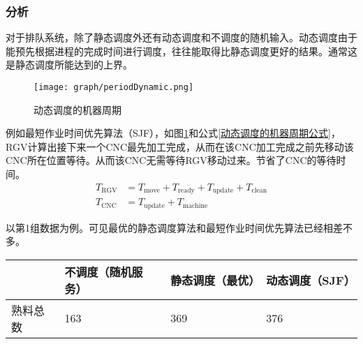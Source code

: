 		\subsubsection{分析}
			对于排队系统，除了静态调度外还有动态调度和不调度的随机输入。动态调度由于能预先根据进程的完成时间进行调度，往往能取得比静态调度更好的结果。通常这是静态调度所能达到的上界。
			\begin{figure}[htbp]
				\centering
				\caption{动态调度的机器周期}
				\label{动态调度的机器周期}
				\texttt{[image: graph/periodDynamic.png]}
			\end{figure}
			\par\indent 例如最短作业时间优先算法（SJF），如图\ref{动态调度的机器周期}和公式\ref{动态调度的机器周期公式}，RGV计算出接下来一个CNC最先加工完成，从而在该CNC加工完成之前先移动该CNC所在位置等待。从而该CNC无需等待RGV移动过来。节省了CNC的等待时间。
			\begin{align}
				\label{动态调度的机器周期公式}
				T_\mathrm{RGV} & =T_\mathrm{move}+T_\mathrm{ready}+T_\mathrm{update}+T_\mathrm{clean} \\
				T_\mathrm{CNC} & =T_\mathrm{update}+T_\mathrm{machine}
			\end{align}
			\par\indent 以第1组数据为例。可见最优的静态调度算法和最短作业时间优先算法已经相差不多。
			\begin{table}[htbp]
				\centering
				\caption{3种调度情况的比较}
				\label{3种调度情况的比较}
				\begin{longtabu}to
					\toprule
					&不调度（随机服务）&静态调度（最优）&动态调度（SJF）\\\midrule
					熟料总数&163	&369	&376	\\\bottomrule
				\end{longtabu}
			\end{table}
